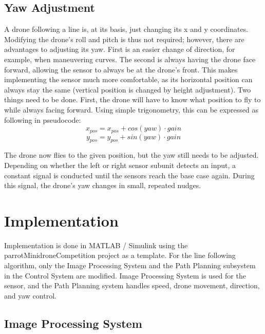 \documentclass[a4paper, 10pt, conference]{IEEEtran}
\begin{document}
\subsection{Yaw Adjustment}
A drone following a line is, at its basis, just changing its x and y coordinates. Modifying the drone’s roll and pitch is thus not required; however, there are advantages to adjusting its yaw.
First is an easier change of direction, for example, when maneuvering curves. The second is always having the drone face forward, allowing the sensor to always be at the drone’s front. This makes implementing the sensor much more comfortable, as its horizontal position can always stay the same (vertical position is changed by height adjustment).
Two things need to be done. First, the drone will have to know what position to fly to while always facing forward. Using simple trigonometry, this can be expressed as following in pseudocode:
\begin{equation}
    x_{pos} = x_{pos} + cos(yaw) \cdot gain
\end{equation}
\begin{equation}
     y_{pos} = y_{pos} + sin(yaw) \cdot gain
\end{equation}\par
The drone now flies to the given position, but the yaw still needs to be adjusted.
Depending on whether the left or right sensor subunit detects an input, a constant signal is conducted until the sensors reach the base case again. During this signal, the drone’s yaw changes in small, repeated nudges.\\


\section{Implementation}
Implementation is done in MATLAB / Simulink using the parrotMinidroneCompetition project as a template. For the line following algorithm, only the Image Processing System and the Path Planning subsystem in the Control System are modified. Image Processing System is used for the sensor, and the Path Planning system handles speed, drone movement, direction, and yaw control.\\

\subsection{Image Processing System}
\end{document}
